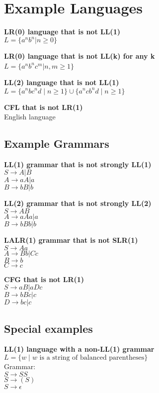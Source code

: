 
\section{Example Languages}
\textbf{LR(0) language that is not LL(1)}\\
    $L = \{a^n b^n | n \geq 0\}$

\textbf{LR(0) language that is not LL(k) for any k}\\
$L = \{a^n b^n c^m | n, m \geq 1\} $\

\textbf{LL(2) language that is not LL(1)}\\
$L = \{ a^n b c^n d \mid n \geq 1 \} \cup \{ a^n c b^n d \mid n \geq 1 \}$

\textbf{CFL that is not LR(1)}\\
    English language

\subsection{Example Grammars}
\textbf{LL(1) grammar that is not strongly LL(1)}\\ %
    $S \rightarrow A | B$\\
    $A \rightarrow aA | a$\\
    $B \rightarrow bB | b$

\textbf{LL(2) grammar that is not strongly LL(2)}\\
    $S \rightarrow A B$\\
    $A \rightarrow a A a | a$\\
    $B \rightarrow b B b | b$

\textbf{LALR(1) grammar that is not SLR(1)}\\
    $S \rightarrow A a$\\
    $A \rightarrow B b | C c$\\
    $B \rightarrow b$\\
    $C \rightarrow c$

\textbf{CFG that is not LR(1)}\\
    $S\rightarrow aB|aDc$\\
    $B\rightarrow bBc|c$\\
    $D\rightarrow bc|c$

\subsection{Special examples}
\textbf{LL(1) language with a non-LL(1) grammar}
$L = \{ w \mid w \text{ is a string of balanced parentheses} \}$\\
Grammar:\\
$S \rightarrow S S$\\
$S \rightarrow ( S )$\\
$S \rightarrow \epsilon$\\
